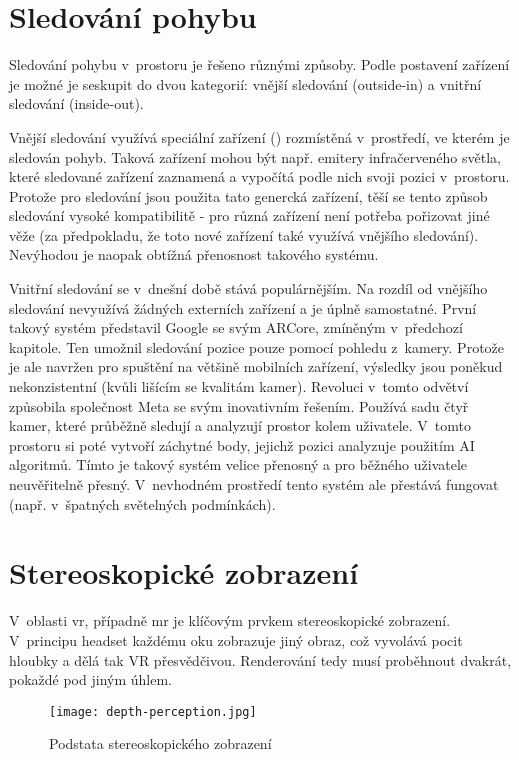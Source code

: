\section{Sledování pohybu}

Sledování pohybu v~prostoru je řešeno různými způsoby. Podle postavení zařízení je možné je seskupit do dvou kategorií: vnější sledování (outside-in) a vnitřní sledování (inside-out).

Vnější sledování využívá speciální zařízení () rozmístěná v~prostředí, ve kterém je sledován pohyb. Taková zařízení mohou být např. emitery infračerveného světla, které sledované zařízení zaznamená a vypočítá podle nich svoji pozici v~prostoru. Protože pro sledování jsou použita tato genercká zařízení, těší se tento způsob sledování vysoké kompatibilitě - pro různá zařízení není potřeba pořizovat jiné věže (za předpokladu, že toto nové zařízení také využívá vnějšího sledování). Nevýhodou je naopak obtížná přenosnost takového systému. \cite{vr_tracking_suvi}

Vnitřní sledování se v~dnešní době stává populárnějším. Na rozdíl od vnějšího sledování nevyužívá žádných externích zařízení a je úplně samostatné. První takový systém představil Google se svým ARCore, zmíněným v~předchozí kapitole. Ten umožnil sledování pozice pouze pomocí pohledu z~kamery. Protože je ale navržen pro spuštění na většině mobilních zařízení, výsledky jsou poněkud nekonzistentní (kvůli lišícím se kvalitám kamer).
Revoluci v~tomto odvětví způsobila společnost Meta se svým inovativním řešením. Používá sadu čtyř kamer, které průběžně sledují a analyzují prostor kolem uživatele. V~tomto prostoru si poté vytvoří záchytné body, jejichž pozici analyzuje použitím AI algoritmů. Tímto je takový systém velice přenosný a pro běžného uživatele neuvěřitelně přesný. V~nevhodném prostředí tento systém ale přestává fungovat (např. v~špatných světelných podmínkách). \cite{vr_tracking_suvi} \cite{enwiki:1182789097}

\section{Stereoskopické zobrazení}

V~oblasti \gls{vr}, případně \gls{mr} je klíčovým prvkem stereoskopické zobrazení. V~principu headset každému oku zobrazuje jiný obraz, což vyvolává pocit hloubky a dělá tak VR přesvědčivou. Renderování tedy musí proběhnout dvakrát, pokaždé pod jiným úhlem. \cite{stereoskopie_diagram}

\begin{figure}[H]
    \centering
    \texttt{[image: depth-perception.jpg]}
    \caption{Podstata stereoskopického zobrazení \cite{stereoskopie_diagram}}
    \label{depth_perception}
\end{figure}


